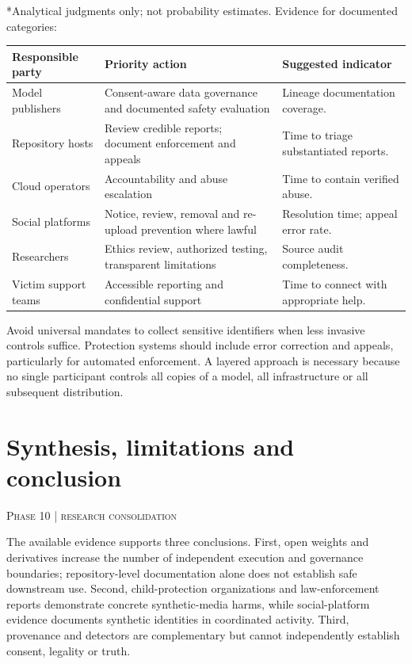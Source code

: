 \documentclass[11pt,a4paper]{article}
\newcommand{\sect}[2]{\section{#1}\textcolor{muted}{\small\textsc{#2}}\par\vspace{2mm}}
\begin{document}
*Analytical judgments only; not probability estimates. Evidence for documented categories:  \cite{iwf,ncmec25,fbi,meta,ftcads}


\begin{center}\small\begin{tabularx}{\linewidth}{@{}YYY@{}}\toprule
\textbf{Responsible party} & \textbf{Priority action} & \textbf{Suggested indicator}\\\midrule
Model publishers & Consent-aware data governance and documented safety evaluation & Lineage documentation coverage.\\
Repository hosts & Review credible reports; document enforcement and appeals & Time to triage substantiated reports.\\
Cloud operators & Accountability and abuse escalation & Time to contain verified abuse.\\
Social platforms & Notice, review, removal and re-upload prevention where lawful & Resolution time; appeal error rate.\\
Researchers & Ethics review, authorized testing, transparent limitations & Source audit completeness.\\
Victim support teams & Accessible reporting and confidential support & Time to connect with appropriate help.\\\bottomrule\end{tabularx}\end{center}

Avoid universal mandates to collect sensitive identifiers when less invasive controls suffice. Protection systems should include error correction and appeals, particularly for automated enforcement. A layered approach is necessary because no single participant controls all copies of a model, all infrastructure or all subsequent distribution.


\clearpage\sect{Synthesis, limitations and conclusion}{Phase 10 | research consolidation}

The available evidence supports three conclusions. First, open weights and derivatives increase the number of independent execution and governance boundaries; repository-level documentation alone does not establish safe downstream use. Second, child-protection organizations and law-enforcement reports demonstrate concrete synthetic-media harms, while social-platform evidence documents synthetic identities in coordinated activity. Third, provenance and detectors are complementary but cannot independently establish consent, legality or truth. \cite{hfcards,iwf,ncmec25,fbi,meta,nist,c2pa}
\end{document}
